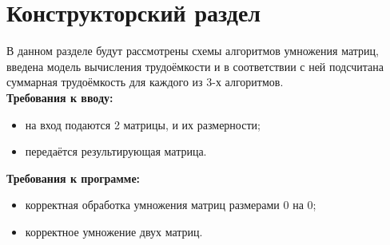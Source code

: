 \chapter{Конструкторский раздел}
\label{cha:design}
В данном разделе будут рассмотрены схемы алгоритмов умножения матриц, введена модель вычисления трудоёмкости и в соответствии с ней подсчитана суммарная трудоёмкость для каждого из 3-х алгоритмов.\\
\textbf{Требования к вводу:}
\begin{itemize}
	\item на вход подаются 2 матрицы, и их размерности;
	\item передаётся результирующая матрица.
\end{itemize}
\textbf{Требования к программе:}
\begin{itemize}
	\item корректная обработка умножения матриц размерами 0 на 0;
	\item корректное умножение двух матриц.
\end{itemize}

